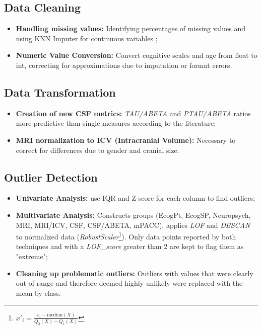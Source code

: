 \subsection{Data Cleaning}
\begin{itemize}
	\item \textbf{Handling missing values:} Identifying percentages of missing values and using KNN Imputer for continuous variables ;
	\item \textbf{Numeric Value Conversion:} Convert cognitive scales and age from float to int, correcting for approximations due to imputation or format errors.
\end{itemize}

\subsection{Data Transformation}
\begin{itemize}
	\item \textbf{Creation of new CSF metrics:} \textit{TAU/ABETA} and \textit{PTAU/ABETA} ratios more predictive than single measures according to the literature;
	\item \textbf{MRI normalization to ICV (Intracranial Volume):}
	Necessary to correct for differences due to gender and cranial size.
\end{itemize}

\subsection{Outlier Detection}
\begin{itemize}
	\item \textbf{Univariate Analysis:} use IQR and Z-score for each column to find outliers;
	\item \textbf{Multivariate Analysis:} Constructs groups (EcogPt, EcogSP, Neuropsych, MRI, MRI/ICV, CSF, CSF/ABETA, mPACC), applies \textit{LOF} and \textit{DBSCAN} to normalized data (\textit{RobustScaler}\footnote{$x'_i = \frac{x_i - \text{median}(X)}{Q_3(X)-Q_1(X)}$}). Only data points reported by both techniques and with a \textit{LOF\_score} greater than 2 are kept to flag them as "extreme";
	\item \textbf{Cleaning up problematic outliers:} Outliers with values that were clearly out of range and therefore deemed highly unlikely were replaced with the mean by class.
\end{itemize}

